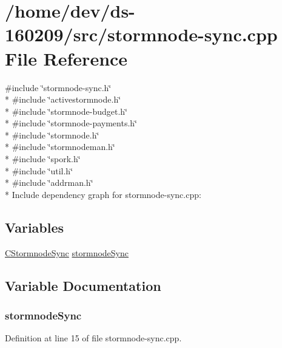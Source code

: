 \hypertarget{stormnode-sync_8cpp}{}\section{/home/dev/ds-\/160209/src/stormnode-\/sync.cpp File Reference}
\label{stormnode-sync_8cpp}
{\ttfamily \#include \char`\"{}stormnode-\/sync.\+h\char`\"{}}\\*
{\ttfamily \#include \char`\"{}activestormnode.\+h\char`\"{}}\\*
{\ttfamily \#include \char`\"{}stormnode-\/budget.\+h\char`\"{}}\\*
{\ttfamily \#include \char`\"{}stormnode-\/payments.\+h\char`\"{}}\\*
{\ttfamily \#include \char`\"{}stormnode.\+h\char`\"{}}\\*
{\ttfamily \#include \char`\"{}stormnodeman.\+h\char`\"{}}\\*
{\ttfamily \#include \char`\"{}spork.\+h\char`\"{}}\\*
{\ttfamily \#include \char`\"{}util.\+h\char`\"{}}\\*
{\ttfamily \#include \char`\"{}addrman.\+h\char`\"{}}\\*
Include dependency graph for stormnode-\/sync.cpp\+:
\subsection*{Variables}
\begin{DoxyCompactItemize}
\item 
\hyperlink{class_c_stormnode_sync}{C\+Stormnode\+Sync} \hyperlink{stormnode-sync_8cpp_a4233fda53cfb60fd6ba208d981ac3fe7}{stormnode\+Sync}
\end{DoxyCompactItemize}


\subsection{Variable Documentation}
\hypertarget{stormnode-sync_8cpp_a4233fda53cfb60fd6ba208d981ac3fe7}{}
\subsubsection[{stormnode\+Sync}]{ stormnode\+Sync}\label{stormnode-sync_8cpp_a4233fda53cfb60fd6ba208d981ac3fe7}


Definition at line 15 of file stormnode-\/sync.\+cpp.

